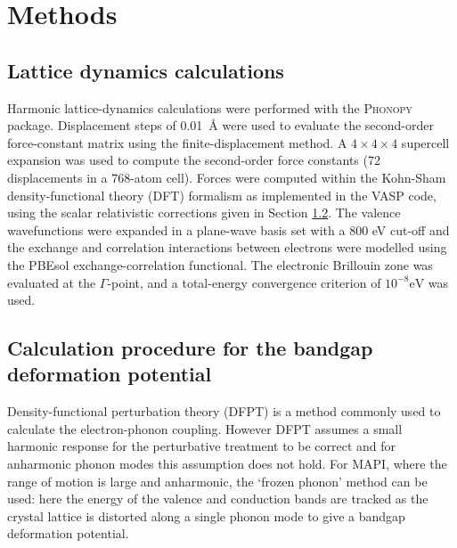 

\section{Methods}

\subsection{Lattice dynamics calculations}

Harmonic lattice-dynamics calculations were performed with the \textsc{Phonopy} package.\autocite{Togo2015} Displacement steps of \SI{0.01}{\angstrom} were used to evaluate the second-order force-constant matrix using the finite-displacement method. A $4\! \times\! 4\! \times\! 4$ supercell expansion was used to compute the second-order force constants (72 displacements in a 768-atom cell).
Forces were computed within the Kohn-Sham density-functional theory (DFT) formalism as implemented in the \textsc{VASP} code,\autocite{Kresse1996a} using the scalar relativistic corrections given in Section \ref{bgdefmethod}.
The valence wavefunctions were expanded in a plane-wave basis set with a 800 eV cut-off and the exchange and correlation interactions between electrons were modelled using the PBEsol exchange-correlation functional.\autocite{Perdew2008a}
The electronic Brillouin zone was evaluated at the $\Gamma$-point, and a total-energy convergence criterion of $10^{-8}\textrm{eV}$ was used.

\subsection{Calculation procedure for the bandgap deformation potential} \label{bgdefmethod}

Density-functional perturbation theory (DFPT) is a method commonly used to calculate the electron-phonon coupling. However DFPT assumes a small harmonic response for the perturbative treatment to be correct and for anharmonic phonon modes this assumption does not hold.
For MAPI, where the range of motion is large and anharmonic, the `frozen phonon' method can be used: here the energy of the valence and conduction bands are tracked as the crystal lattice is distorted along a single phonon mode to give a bandgap deformation potential.

